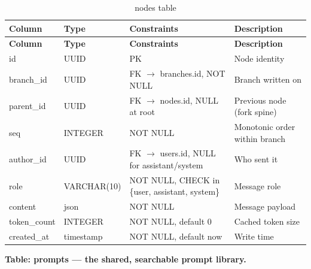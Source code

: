 \documentclass[12pt,a4paper]{report}
\begin{document}
\begingroup
\setlength{\parskip}{0pt}\renewcommand{\arraystretch}{1.32}\footnotesize
\begin{xltabular}{\textwidth}{>{\hsize\raggedright\arraybackslash}X >{\hsize\raggedright\arraybackslash}X >{\hsize\raggedright\arraybackslash}X >{\hsize\raggedright\arraybackslash}X}
\caption{nodes table}\\
\toprule
\textbf{Column} & \textbf{Type} & \textbf{Constraints} & \textbf{Description} \\
\midrule\endfirsthead
\toprule
\textbf{Column} & \textbf{Type} & \textbf{Constraints} & \textbf{Description} \\
\midrule\endhead
\bottomrule\endfoot
id & UUID & PK & Node identity \\
branch\_id & UUID & FK $\rightarrow$ branches.id, NOT NULL & Branch written on \\
parent\_id & UUID & FK $\rightarrow$ nodes.id, NULL at root & Previous node (fork spine) \\
seq & INTEGER & NOT NULL & Monotonic order within branch \\
author\_id & UUID & FK $\rightarrow$ users.id, NULL for assistant/system & Who sent it \\
role & VARCHAR(10) & NOT NULL, CHECK in \{user, assistant, system\} & Message role \\
content & json & NOT NULL & Message payload \\
token\_count & INTEGER & NOT NULL, default 0 & Cached token size \\
created\_at & timestamp & NOT NULL, default now & Write time \\
\end{xltabular}
\endgroup

\noindent\textbf{Table: prompts --- the shared, searchable prompt library.}
\end{document}
